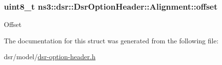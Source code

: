 \subsubsection[{\texorpdfstring{offset}{offset}}]{\setlength{\rightskip}{0pt plus 5cm}uint8\+\_\+t ns3\+::dsr\+::\+Dsr\+Option\+Header\+::\+Alignment\+::offset}\hypertarget{structns3_1_1dsr_1_1DsrOptionHeader_1_1Alignment_a5b561bf84fff4254d78fd2422e5435d1}{}\label{structns3_1_1dsr_1_1DsrOptionHeader_1_1Alignment_a5b561bf84fff4254d78fd2422e5435d1}
Offset 

The documentation for this struct was generated from the following file\+:\begin{DoxyCompactItemize}
\item 
dsr/model/\hyperlink{dsr-option-header_8h}{dsr-\/option-\/header.\+h}\end{DoxyCompactItemize}
